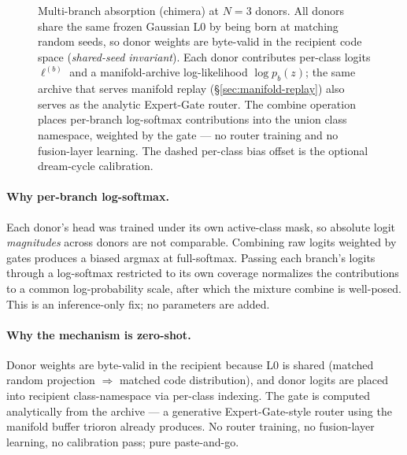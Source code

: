 \documentclass[11pt]{article}
\begin{document}
\begin{figure}[t]
\caption{Multi-branch absorption (chimera) at $N=3$ donors. All
donors share the same frozen Gaussian L0 by being born at matching
random seeds, so donor weights are byte-valid in the recipient code
space (\emph{shared-seed invariant}). Each donor contributes per-class
logits $\ell^{(b)}$ and a manifold-archive log-likelihood
$\log p_b(z)$; the same archive that serves manifold replay
(\S\ref{sec:manifold-replay}) also serves as the analytic Expert-Gate
\citep{aljundi2017expert} router. The combine operation places
per-branch log-softmax contributions into the union class namespace,
weighted by the gate --- no router training and no fusion-layer
learning. The dashed per-class bias offset is the optional
dream-cycle calibration.}
\label{fig:chimera}
\end{figure}

\paragraph{Why per-branch log-softmax.}
Each donor's head was trained under its own active-class mask, so
absolute logit \emph{magnitudes} across donors are not comparable.
Combining raw logits weighted by gates produces a biased argmax at
full-softmax. Passing each branch's logits through a log-softmax
restricted to its own coverage normalizes the contributions to a
common log-probability scale, after which the mixture combine is
well-posed. This is an inference-only fix; no parameters are added.

\paragraph{Why the mechanism is zero-shot.}
Donor weights are byte-valid in the recipient because L0 is shared
(matched random projection $\Rightarrow$ matched code distribution),
and donor logits are placed into recipient class-namespace via
per-class indexing. The gate is computed analytically from the
archive --- a generative Expert-Gate-style router
\citep{aljundi2017expert} using the manifold buffer trioron already
produces. No router training, no fusion-layer learning, no calibration
pass; pure paste-and-go.
\end{document}
